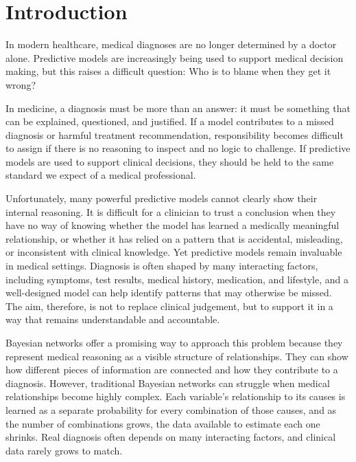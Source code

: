 \documentclass[a4paper,fleqn]{cas-dc}
\begin{document}
\maketitle

\section{Introduction}\label{sec:intro}

In modern healthcare, medical diagnoses are no longer determined by a doctor alone. Predictive models are increasingly being used to support medical decision making, but this raises a difficult question: Who is to blame when they get it wrong?

In medicine, a diagnosis must be more than an answer: it must be something that can be explained, questioned, and justified. If a model contributes to a missed diagnosis or harmful treatment recommendation, responsibility becomes difficult to assign if there is no reasoning to inspect and no logic to challenge. If predictive models are used to support clinical decisions, they should be held to the same standard we expect of a medical professional.

Unfortunately, many powerful predictive models cannot clearly show their internal reasoning. It is difficult for a clinician to trust a conclusion when they have no way of knowing whether the model has learned a medically meaningful relationship, or whether it has relied on a pattern that is accidental, misleading, or inconsistent with clinical knowledge. Yet predictive models remain invaluable in medical settings. Diagnosis is often shaped by many interacting factors, including symptoms, test results, medical history, medication, and lifestyle, and a well-designed model can help identify patterns that may otherwise be missed. The aim, therefore, is not to replace clinical judgement, but to support it in a way that remains understandable and accountable.

Bayesian networks offer a promising way to approach this problem because they represent medical reasoning as a visible structure of relationships. They can show how different pieces of information are connected and how they contribute to a diagnosis. However, traditional Bayesian networks can struggle when medical relationships become highly complex. Each variable's relationship to its causes is learned as a separate probability for every combination of those causes, and as the number of combinations grows, the data available to estimate each one shrinks. Real diagnosis often depends on many interacting factors, and clinical data rarely grows to match.
\end{document}
